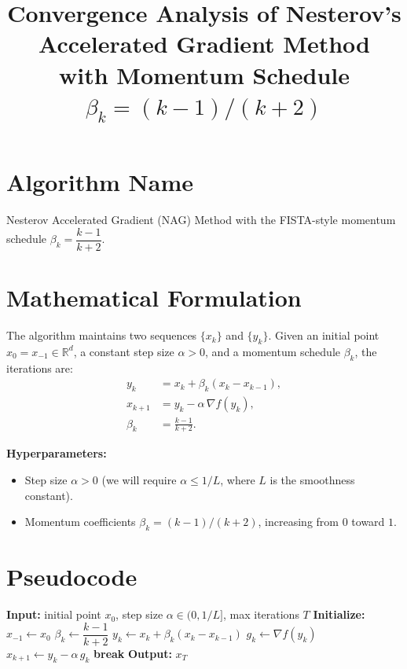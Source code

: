 \documentclass{article}
\title{Convergence Analysis of Nesterov's Accelerated Gradient Method \\ with Momentum Schedule $\beta_k = (k-1)/(k+2)$}
\author{}
\date{}
\begin{document}
\maketitle

\section*{Algorithm Name}
Nesterov Accelerated Gradient (NAG) Method with the FISTA-style momentum schedule
$\beta_k = \dfrac{k-1}{k+2}$.

\section*{Mathematical Formulation}

The algorithm maintains two sequences $\{x_k\}$ and $\{y_k\}$. Given an initial
point $x_0 = x_{-1} \in \mathbb{R}^d$, a constant step size $\alpha > 0$, and a
momentum schedule $\beta_k$, the iterations are:
\begin{align}
y_k     &= x_k + \beta_k (x_k - x_{k-1}), \label{eq:y}\\
x_{k+1} &= y_k - \alpha\, \nabla f(y_k), \label{eq:x}\\
\beta_k &= \frac{k-1}{k+2}. \label{eq:beta}
\end{align}

\noindent\textbf{Hyperparameters:}
\begin{itemize}
\item Step size $\alpha > 0$ (we will require $\alpha \le 1/L$, where $L$ is the
      smoothness constant).
\item Momentum coefficients $\beta_k = (k-1)/(k+2)$, increasing from $0$ toward $1$.
\end{itemize}

\section*{Pseudocode}

\begin{algorithm}[H]
\caption{Nesterov Accelerated Gradient with $\beta_k = (k-1)/(k+2)$}
\begin{algorithmic}[1]
\State \textbf{Input:} initial point $x_0$, step size $\alpha \in (0, 1/L]$, max iterations $T$
\State \textbf{Initialize:} $x_{-1} \gets x_0$
    \State $\beta_k \gets \dfrac{k-1}{k+2}$
    \State $y_k \gets x_k + \beta_k (x_k - x_{k-1})$ 
    \State $g_k \gets \nabla f(y_k)$ 
    \State $x_{k+1} \gets y_k - \alpha\, g_k$ 
     
        \State \textbf{break}
    \EndIf
\EndFor
\State \textbf{Output:} $x_T$
\end{algorithmic}
\end{algorithm}
\end{document}
